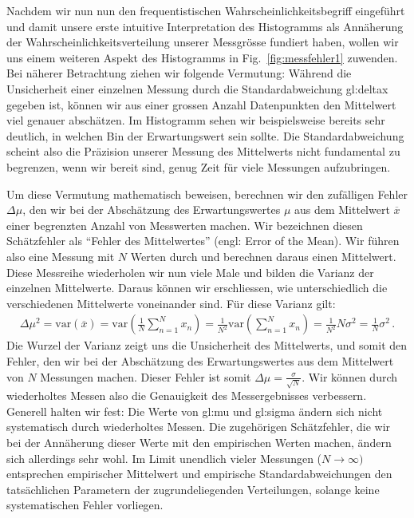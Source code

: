 Nachdem wir nun nun den frequentistischen Wahrscheinlichkeitsbegriff eingeführt und damit unsere erste intuitive Interpretation des Histogramms als Annäherung der Wahrscheinlichkeitsverteilung unserer Messgrösse fundiert haben, wollen wir uns einem weiteren Aspekt des Histogramms in   Fig.~\ref{fig:messfehler1} zuwenden. Bei näherer Betrachtung ziehen wir folgende Vermutung: Während die Unsicherheit einer einzelnen Messung durch die Standardabweichung \gls{gl:deltax} gegeben ist, können wir aus einer grossen Anzahl Datenpunkten den Mittelwert viel genauer abschätzen. Im Histogramm sehen wir beispielsweise bereits sehr deutlich, in welchen Bin der Erwartungswert sein sollte. Die Standardabweichung scheint also die Präzision unserer Messung des Mittelwerts nicht fundamental zu begrenzen, wenn wir bereit sind, genug Zeit für viele Messungen aufzubringen.


Um diese Vermutung mathematisch beweisen, berechnen wir den zufälligen Fehler $\Delta{\mu}$, den wir bei der Abschätzung des Erwartungswertes $\mu$ aus dem Mittelwert $\overline{x}$ einer begrenzten Anzahl von Messwerten machen. Wir bezeichnen diesen Schätzfehler als ``Fehler des Mittelwertes'' (engl: Error of the Mean). Wir führen also eine Messung mit $N$ Werten durch und berechnen daraus einen Mittelwert. Diese Messreihe wiederholen wir nun viele Male und bilden die Varianz der einzelnen Mittelwerte. Daraus können wir erschliessen, wie unterschiedlich die verschiedenen Mittelwerte voneinander sind. Für diese Varianz gilt:
\begin{align}
\Delta{\mu}^2 = \text{var} \left( \overline{x} \right) = \text{var} \left( \frac{1}{N} \sum^N_{n=1} x_n \right) = \frac{1}{N^2} \text{var} \left( \sum^N_{n=1} x_n \right) = \frac{1}{N^2} N \sigma^2 = \frac{1}{N} \sigma^2\,.
\label{eq:vl3-1}
\end{align}
Die Wurzel der Varianz zeigt uns die Unsicherheit des Mittelwerts, und somit den Fehler, den wir bei der Abschätzung des Erwartungswertes aus dem Mittelwert von $N$ Messungen machen.  Dieser Fehler ist somit $\Delta \mu = \frac{ \sigma }{ \sqrt{N} }$. Wir können durch wiederholtes Messen also die Genauigkeit des Messergebnisses verbessern. Generell halten wir fest: Die Werte von \gls{gl:mu} und  \gls{gl:sigma} ändern sich nicht systematisch durch wiederholtes Messen. Die zugehörigen Schätzfehler, die wir bei der Annäherung dieser Werte mit den empirischen Werten machen, ändern sich allerdings sehr wohl. Im Limit unendlich vieler Messungen ($N  \rightarrow  \infty)$ entsprechen empirischer Mittelwert und empirische Standardabweichungen den tatsächlichen Parametern der zugrundeliegenden Verteilungen, solange keine systematischen Fehler vorliegen.

